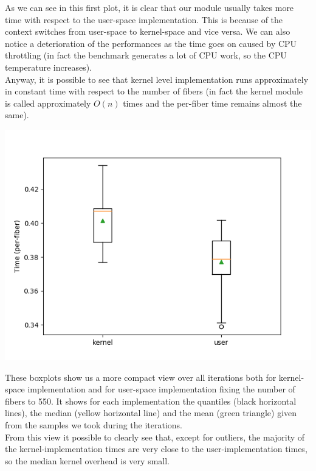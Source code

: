 \documentclass[a4paper]{article}
\begin{document}
As we can see in this first plot, it is clear that our module usually takes more time with respect to the user-space implementation. This is because of the context switches from user-space to kernel-space and vice versa. We can also notice a deterioration of the performances as the time goes on caused by CPU throttling (in fact the benchmark generates a lot of CPU work, so the CPU temperature increases).\\
Anyway, it is possible to see that kernel level implementation runs approximately in constant time with respect to the number of fibers (in fact the kernel module is called approximately $O(n)$ times and the per-fiber time remains almost the same).

\begin{center}
\includegraphics[scale=0.65]{../perf/boxplots}\bigskip\\
\end{center}

These boxplots show us a more compact view over all iterations both for kernel-space implementation and for user-space implementation fixing the number of fibers to 550.
It shows for each implementation the quantiles (black horizontal lines), the median (yellow horizontal line) and the mean (green triangle) given from the samples we took during the iterations.\\
From this view it possible to clearly see that, except for outliers, the majority of the kernel-implementation times are very close to the user-implementation times, so the median kernel overhead is very small.
\end{document}
